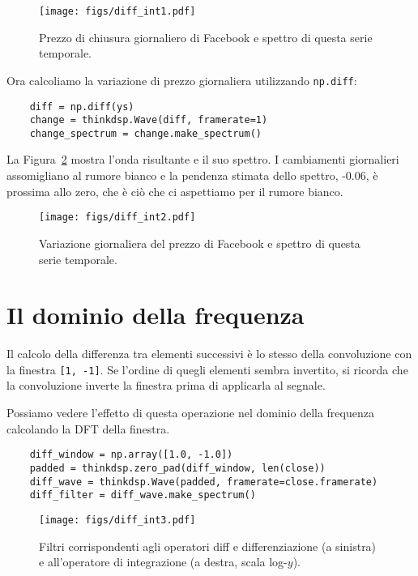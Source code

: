 \documentclass[12pt,a4paper]{book}
\begin{document}
\begin{figure} 

\centerline{\texttt{[image: figs/diff\_int1.pdf]}} \caption{Prezzo di chiusura giornaliero di Facebook e spettro di questa serie temporale.} \label{fig.diff_int1} \end{figure} 

Ora calcoliamo la variazione di prezzo giornaliera utilizzando {\tt np.diff}:

\begin{verbatim} 
    diff = np.diff(ys)
    change = thinkdsp.Wave(diff, framerate=1)
    change_spectrum = change.make_spectrum()
 \end{verbatim} 

La Figura~\ref{fig.diff_int2} mostra l'onda risultante e il suo spettro. I cambiamenti giornalieri assomigliano al rumore bianco e la pendenza stimata dello spettro, -0.06, è prossima allo zero, che è ciò che ci aspettiamo per il rumore bianco.

\begin{figure} 

\centerline{\texttt{[image: figs/diff\_int2.pdf]}} \caption{Variazione giornaliera del prezzo di Facebook e spettro di questa serie temporale.} \label{fig.diff_int2} \end{figure} 

\section{Il dominio della frequenza} 

Il calcolo della differenza tra elementi successivi è lo stesso della convoluzione con la finestra {\tt [1, -1]}. Se l'ordine di quegli elementi sembra invertito, si ricorda che la convoluzione inverte la finestra prima di applicarla al segnale.

Possiamo vedere l'effetto di questa operazione nel dominio della frequenza calcolando la DFT della finestra.

\begin{verbatim} 
    diff_window = np.array([1.0, -1.0])
    padded = thinkdsp.zero_pad(diff_window, len(close))
    diff_wave = thinkdsp.Wave(padded, framerate=close.framerate)
    diff_filter = diff_wave.make_spectrum()
 \end{verbatim} 

\begin{figure} 

\centerline{\texttt{[image: figs/diff\_int3.pdf]}} \caption{Filtri corrispondenti agli operatori diff e differenziazione (a sinistra) e all'operatore di integrazione (a destra, scala log-$y$).} \label{fig.diff_int3} \end{figure} 
\end{document}
